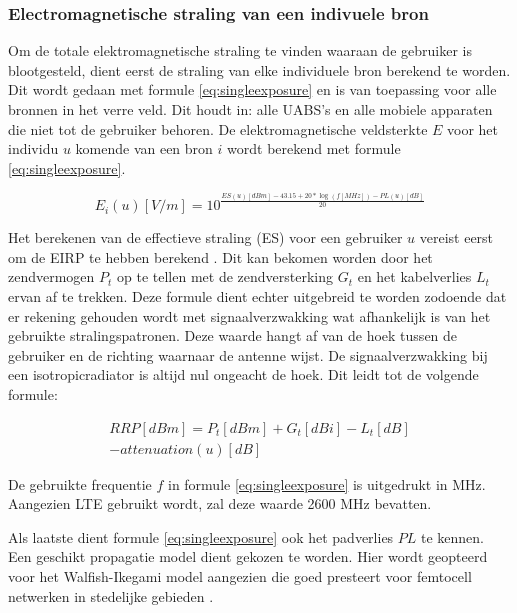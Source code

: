 \documentclass[twocolumn]{phdsymp_dutch}
\begin{document}
\subsubsection{Electromagnetische straling van een indivuele bron}
\label{sec:calculatingexposure}

Om de totale elektromagnetische straling te vinden waaraan de gebruiker is blootgesteld, dient eerst
de straling van elke individuele bron berekend te worden.
Dit wordt gedaan met formule  \ref{eq:singleexposure} en is van toepassing voor alle bronnen in het verre veld.
Dit houdt in: alle  \gls{UABS}'s en alle mobiele apparaten die niet tot de gebruiker behoren.
De elektromagnetische veldsterkte $E$ voor het individu $u$ komende van een bron $i$ wordt berekend 
met formule \ref{eq:singleexposure}. 


\begin{equation}
E_i(u) [V/m] = 10^{\frac{ES(u)[dBm] - 43.15 + 20*\log(f [MHz])- PL(u) [dB]}{20}}
\label{eq:singleexposure}
\end{equation}

Het berekenen van de effectieve straling (ES) voor een gebruiker $u$ vereist eerst om de  \gls{EIRP} te hebben berekend 
 \cite{J6_originalExposureFormula,J1}. Dit kan bekomen worden door het zendvermogen $P_t$ op te tellen met de zendversterking $G_t$
 en het kabelverlies $L_t$ ervan af te trekken.
 Deze formule dient echter uitgebreid te worden zodoende dat er rekening gehouden wordt met signaalverzwakking wat afhankelijk is van 
 het gebruikte stralingspatronen. Deze waarde hangt af van de hoek tussen de gebruiker en de richting waarnaar de antenne wijst. 
 De signaalverzwakking bij een \gls{isotropicradiator} is altijd nul ongeacht de hoek.
 Dit leidt tot de volgende formule:

\begin{equation}
\begin{aligned}
RRP [dBm] = P_t [dBm] + G_t [dBi]- L_t [dB]\\
     - attenuation(u) [dB]
\end{aligned}
\label{eq:eirp}
\end{equation}

De gebruikte frequentie $f$ in formule \ref{eq:singleexposure} is uitgedrukt in MHz. Aangezien 
\gls{LTE} gebruikt wordt, zal deze waarde 2600 MHz bevatten.

Als laatste dient formule \ref{eq:singleexposure} ook het padverlies $PL$ te kennen.
Een geschikt propagatie model dient gekozen te worden. Hier wordt geopteerd voor het 
Walfish-Ikegami model aangezien die goed presteert voor femtocell netwerken in stedelijke gebieden \cite{J2}.
\end{document}
